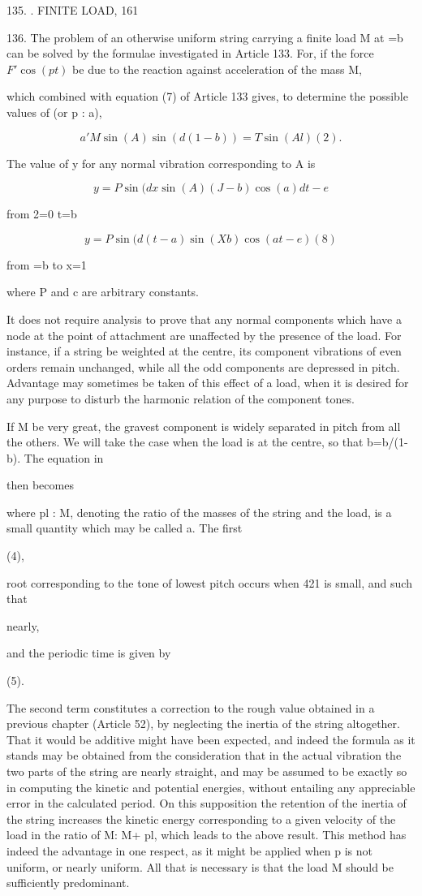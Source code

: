 135. . FINITE LOAD, 161

136. The problem of an otherwise uniform string carrying a finite load M at =b
can be solved by the formulae investigated in Article 133. For, if the force
\(F' \cos(pt)\) be due to the reaction against acceleration of the mass M,

which combined with equation (7) of Article 133 gives, to determine the
possible values of (or p : a),

\[a' M \sin(A) \sin(d (1 - b)) = T \sin(Al) (2).\]

The value of y for any normal vibration corresponding to A is

\[y = P \sin(dx \sin(A) (J- b) \cos(a) dt - e\]

from 2=0 t=b

\[y= P \sin(d(t-a) \sin(Xb) \cos(at-e) (8)\]

from =b to x=1

where P and c are arbitrary constants.

It does not require analysis to prove that any normal components which have a
node at the point of attachment are unaffected by the presence of the load. For
instance, if a string be weighted at the centre, its component vibrations of
even orders remain unchanged, while all the odd components are depressed in
pitch. Advantage may sometimes be taken of this effect of a load, when it is
desired for any purpose to disturb the harmonic relation of the component
tones.

If M be very great, the gravest component is widely separated in pitch from all
the others. We will take the case when the load is at the centre, so that
b=b/(1-b). The equation in

then becomes

where pl : M, denoting the ratio of the masses of the string and the load, is a
small quantity which may be called a. The first

(4),

root corresponding to the tone of lowest pitch occurs when 421 is small, and
such that

nearly,

and the periodic time is given by

(5).

The second term constitutes a correction to the rough value obtained in a
previous chapter (Article 52), by neglecting the inertia of the string
altogether. That it would be additive might have been expected, and indeed the
formula as it stands may be obtained from the consideration that in the actual
vibration the two parts of the string are nearly straight, and may be assumed
to be exactly so in computing the kinetic and potential energies, without
entailing any appreciable error in the calculated period. On this supposition
the retention of the inertia of the string increases the kinetic energy
corresponding to a given velocity of the load in the ratio of M: M+ pl, which
leads to the above result. This method has indeed the advantage in one respect,
as it might be applied when p is not uniform, or nearly uniform. All that is
necessary is that the load M should be sufficiently predominant.

